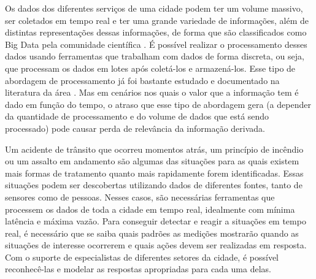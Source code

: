 
 
Os dados dos diferentes serviços de uma cidade podem ter um volume massivo, ser coletados em tempo real e ter uma grande variedade de informações, além de distintas representações dessas informações, de forma que são classificados como Big Data pela comunidade científica \citep{DBLP:journals/corr/WardB13a}.
É possível realizar o processamento desses dados usando ferramentas que trabalham com dados de forma discreta, ou seja, que processam os dados em lotes após coletá-los e armazená-los. Esse tipo de abordagem de processamento já foi bastante estudado e documentado na literatura da área \citep{Dean:2010:MFD:1629175.1629198, DBLP:journals/corr/MoniruzzamanH13,computers3040117}.
Mas em cenários nos quais o valor que a informação tem é dado em função do tempo,
o atraso que esse tipo de abordagem gera (a depender da quantidade de processamento e do volume de dados que está sendo processado) pode causar perda de relevância da informação derivada.

Um acidente de trânsito que ocorreu momentos atrás, um princípio de incêndio ou um assalto em andamento são algumas das situações para as quais existem mais formas de tratamento quanto mais rapidamente forem identificadas. Essas situações podem ser descobertas utilizando dados de diferentes fontes, tanto de sensores como de pessoas. 
Nesses casos, são necessárias ferramentas que processem os dados de toda a cidade em tempo real, idealmente com mínima latência e máxima vazão. Para conseguir detectar e reagir a situações em tempo real, é necessário que se saiba quais padrões as medições mostrarão quando as situações de interesse ocorrerem e quais ações devem ser realizadas em resposta. Com o suporte de especialistas de diferentes setores da cidade, é possível reconhecê-las e modelar as respostas apropriadas para cada uma delas.





